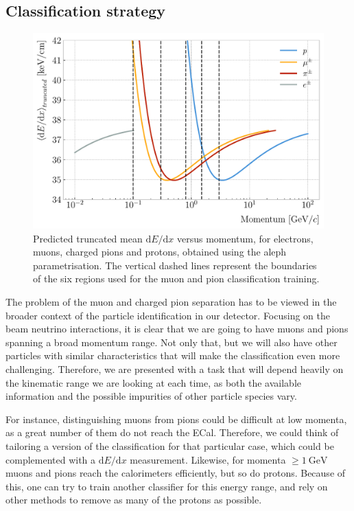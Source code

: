 \subsection{Classification strategy}

\begin{figure}[t]
	\centering
	\includegraphics[width=.80\linewidth]{Images/GArSoft_PID/BDT/dEdx_fit_only.pdf}
	\caption[Predicted truncated $\expval{\mathrm{d}E/\mathrm{d}x}$ versus momentum, for electrons, muons, charged pions and protons, obtained using the \gls{aleph} parametrisation]{Predicted truncated mean $\mathrm{d}E/\mathrm{d}x$ versus momentum, for electrons, muons, charged pions and protons, obtained using the \gls{aleph} parametrisation. The vertical dashed lines represent the boundaries of the six regions used for the muon and pion classification training.}
	\label{fig:dEdx_vs_momentum_regions}
\end{figure}

The problem of the muon and charged pion separation has to be viewed in the broader context of the particle identification in our detector. Focusing on the beam neutrino interactions, it is clear that we are going to have muons and pions spanning a broad momentum range. Not only that, but we will also have other particles with similar characteristics that will make the classification even more challenging. Therefore, we are presented with a task that will depend heavily on the kinematic range we are looking at each time, as both the available information and the possible impurities of other particle species vary.

For instance, distinguishing muons from pions could be difficult at low momenta, as a great number of them do not reach the ECal. Therefore, we could think of tailoring a version of the classification for that particular case, which could be complemented with a $\mathrm{d}E/\mathrm{d}x$ measurement. Likewise, for momenta $\geq 1~\mathrm{GeV}$ muons and pions reach the calorimeters efficiently, but so do protons. Because of this, one can try to train another classifier for this energy range, and rely on other methods to remove as many of the protons as possible.

